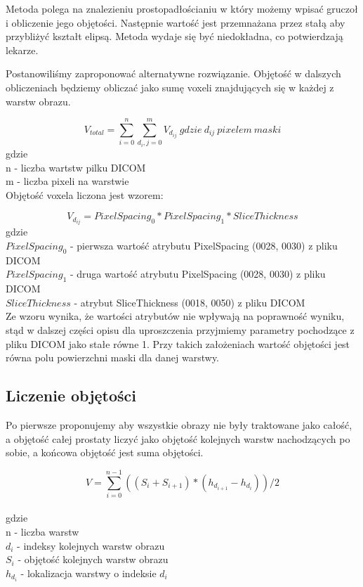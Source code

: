 \documentclass[a4paper,11pt,twoside]{report}
\theoremstyle{definition}
\begin{document}
Metoda polega na znalezieniu prostopadłościaniu w który możemy wpisać gruczoł i obliczenie jego objętości. Następnie wartość jest przemnażana przez stałą aby przybliżyć kształt elipsą. Metoda wydaje się być niedokładna, co potwierdzają lekarze. 
\par
Postanowiliśmy zaproponować alternatywne rozwiązanie. Objętość w dalszych obliczeniach będziemy obliczać jako sumę voxeli znajdujących się w każdej z warstw obrazu. 

\[ V_{total} = \sum_{i=0}^{n} \sum_{d_i, j=0}^{m} V_{d_{ij}} \ gdzie\ d_{ij}\ pixelem\ maski \]
gdzie \\
n - liczba wartstw pilku DICOM \\
m - liczba pixeli na warstwie \\

Objętość voxela liczona jest wzorem:

\[ V_{d_{ij}} = PixelSpacing_0 * PixelSpacing_1 * SliceThickness\]
gdzie \\
\(PixelSpacing_0\) - pierwsza wartość atrybutu PixelSpacing (0028, 0030) z pliku DICOM \\
\(PixelSpacing_1\)  - druga wartość atrybutu PixelSpacing (0028, 0030) z pliku DICOM \\
\(SliceThickness\) - atrybut SliceThickness (0018, 0050) z pliku DICOM \\

Ze wzoru wynika, że wartości atrybutów nie wpływają na poprawność wyniku, stąd w dalszej części opisu dla uproszczenia przyjmiemy parametry pochodzące z pliku DICOM jako stałe równe 1. Przy takich założeniach wartość objętości jest równa polu powierzchni maski dla danej warstwy.

\subsection{Liczenie objętości}

Po pierwsze proponujemy aby wszystkie obrazy nie były traktowane jako całość, a objętość całej prostaty liczyć jako objętość kolejnych warstw nachodzących po sobie, a końcowa objętość jest suma objętości. 

\[V = \sum_{i=0}^{n-1} ((S_i + S_{i+1}) * (h_{d_{i+1}} - h_{d_i})) / 2 \]
\\
gdzie\\
n - liczba warstw \\
\(d_i\) - indeksy kolejnych warstw obrazu \\
\(S_i\) - objętość kolejnych warstw obrazu \\
\(h_{d_i}\) - lokalizacja warstwy o indeksie \(d_{i}\) \\
\end{document}
